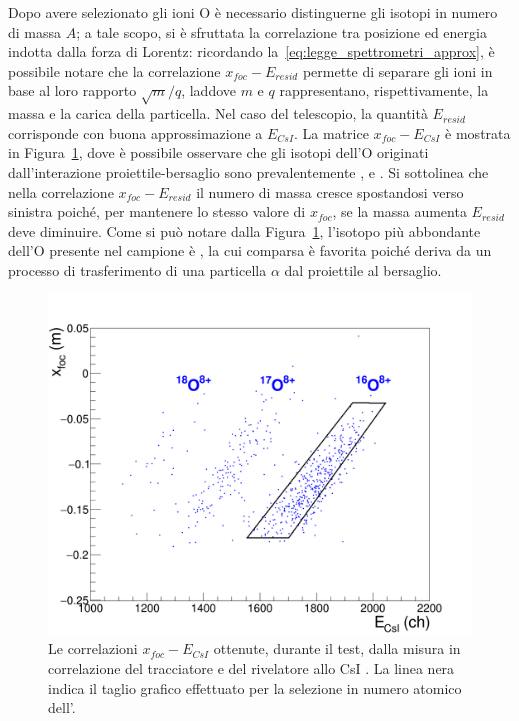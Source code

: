 Dopo avere selezionato gli ioni O è necessario distinguerne gli isotopi in numero di massa $A$; a tale scopo, si è sfruttata la correlazione tra posizione ed energia indotta dalla forza di Lorentz: ricordando la~\ref{eq:legge_spettrometri_approx}, è possibile notare che la correlazione $x_{foc} - E_{resid}$ permette di separare gli ioni in base al loro rapporto $\sqrt{m}/q$, laddove $m$ e $q$ rappresentano, rispettivamente, la massa e la carica della particella.
Nel caso del telescopio, la quantità $E_{resid}$ corrisponde con buona approssimazione a $E_{CsI}$.
La matrice $x_{foc} - E_{CsI}$ è mostrata in Figura~\ref{fig:xfoc2_csi_standard}, dove è possibile osservare che gli isotopi dell'O originati dall'interazione proiettile-bersaglio sono prevalentemente ,  e .
Si sottolinea che nella correlazione $x_{foc} - E_{resid}$ il numero di massa cresce spostandosi verso sinistra poiché, per mantenere lo stesso valore di $x_{foc}$, se la massa aumenta $E_{resid}$ deve diminuire.
Come si può notare dalla Figura~\ref{fig:xfoc2_csi_standard}, l'isotopo più abbondante dell'O presente nel campione è , la cui comparsa è favorita poiché deriva da un processo di trasferimento di una particella $\alpha$ dal proiettile al bersaglio. 

\begin{figure} [!p]
	\centering
	\includegraphics[width=\textwidth, keepaspectratio]{Grafici_Tesi/Test/matrice_xfoc2_csi_taglio2.png}
	\caption{Le correlazioni $x_{foc} - E_{CsI}$ ottenute, durante il test, dalla misura in correlazione del tracciatore e del rivelatore allo CsI . La linea nera indica il taglio grafico effettuato per la selezione in numero atomico dell'.} \label{fig:xfoc2_csi_standard}
\end{figure}



